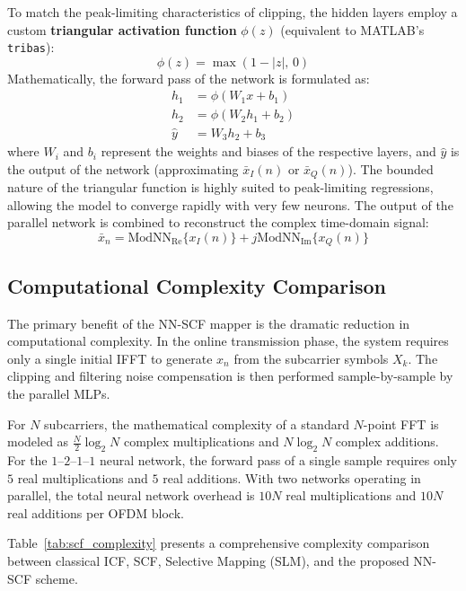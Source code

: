 To match the peak-limiting characteristics of clipping, the hidden layers employ a custom \textbf{triangular activation function} $\phi(z)$ (equivalent to MATLAB's \texttt{tribas}):
\begin{equation*}
    \phi(z) = \max(1 - |z|,\, 0)
\end{equation*}
Mathematically, the forward pass of the network is formulated as:
\begin{align*}
    h_1     & = \phi(W_1 x + b_1)   \\
    h_2     & = \phi(W_2 h_1 + b_2) \\
    \hat{y} & = W_3 h_2 + b_3
\end{align*}
where $W_i$ and $b_i$ represent the weights and biases of the respective layers, and $\hat{y}$ is the output of the network (approximating $\bar{x}_I(n)$ or $\bar{x}_Q(n)$). The bounded nature of the triangular function is highly suited to peak-limiting regressions, allowing the model to converge rapidly with very few neurons. The output of the parallel network is combined to reconstruct the complex time-domain signal:
\begin{equation*}
    \bar{x}_n = \mathrm{ModNN}_{\mathrm{Re}}\{x_I(n)\} + j \mathrm{ModNN}_{\mathrm{Im}}\{x_Q(n)\}
\end{equation*}

\subsection{Computational Complexity Comparison}

The primary benefit of the NN-SCF mapper is the dramatic reduction in computational complexity. In the online transmission phase, the system requires only a single initial IFFT to generate $x_n$ from the subcarrier symbols $X_k$. The clipping and filtering noise compensation is then performed sample-by-sample by the parallel MLPs.

For $N$ subcarriers, the mathematical complexity of a standard $N$-point FFT is modeled as $\frac{N}{2} \log_2 N$ complex multiplications and $N \log_2 N$ complex additions. For the $1\text{--}2\text{--}1\text{--}1$ neural network, the forward pass of a single sample requires only $5$ real multiplications and $5$ real additions. With two networks operating in parallel, the total neural network overhead is $10N$ real multiplications and $10N$ real additions per OFDM block.

Table~\ref{tab:scf_complexity} presents a comprehensive complexity comparison between classical ICF, SCF, Selective Mapping (SLM), and the proposed NN-SCF scheme.


